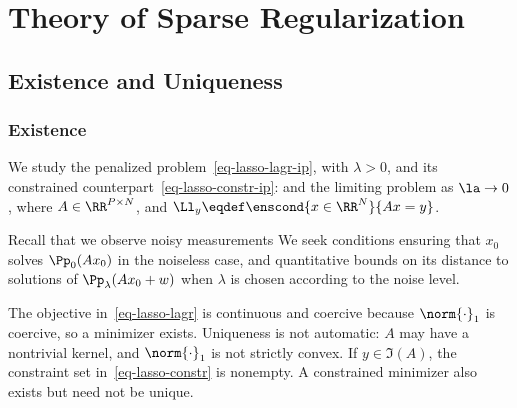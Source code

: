 

\chapter{Theory of Sparse Regularization}

\section{Existence and Uniqueness}


\subsection{Existence}

We study the penalized problem~\eqref{eq-lasso-lagr-ip}, with $\lambda>0$, and its constrained counterpart~\eqref{eq-lasso-constr-ip}:
and the limiting problem as $\la \rightarrow 0$,
where $A \in \RR^{P \times N}$, and $\Ll_y \eqdef \enscond{x \in \RR^N}{Ax=y}$.

Recall that we observe noisy measurements
We seek conditions ensuring that $x_0$ solves $\Pp_0(Ax_0)$ in the noiseless case, and quantitative bounds on its distance to solutions of $\Pp_\lambda(Ax_0+w)$ when $\lambda$ is chosen according to the noise level.

The objective in~\eqref{eq-lasso-lagr} is continuous and coercive because $\norm{\cdot}_1$ is coercive, so a minimizer exists.
%
Uniqueness is not automatic: $A$ may have a nontrivial kernel, and $\norm{\cdot}_1$ is not strictly convex.
%
If $y \in \Im(A)$, the constraint set in~\eqref{eq-lasso-constr} is nonempty. A constrained minimizer also exists but need not be unique.



